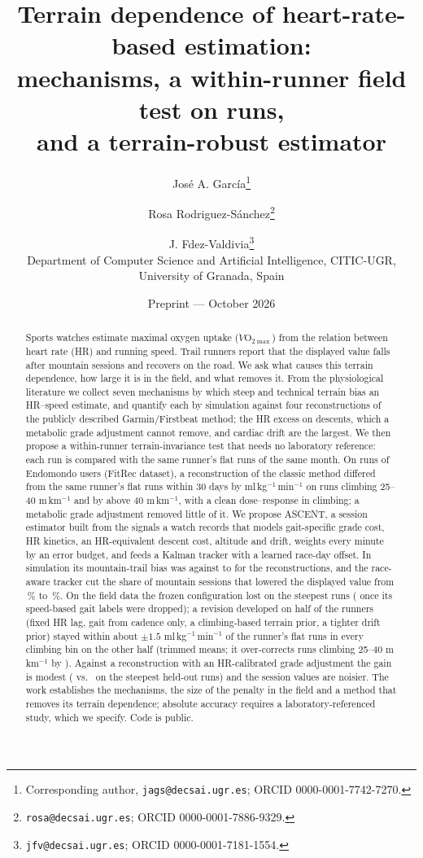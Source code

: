 \documentclass[11pt,a4paper]{article}
\title{\vspace{-1.2cm}\textbf{Terrain dependence of heart-rate-based \VOmax{} estimation:\\ mechanisms, a within-runner field test on \nnFitrecRuns{} runs,\\ and a terrain-robust estimator}}
\author{Jos\'e A. Garc\'ia\thanks{Corresponding author, \texttt{jags@decsai.ugr.es}; ORCID 0000-0001-7742-7270.} \and Rosa Rodriguez-S\'anchez\thanks{\texttt{rosa@decsai.ugr.es}; ORCID 0000-0001-7886-9329.} \and J. Fdez-Valdivia\thanks{\texttt{jfv@decsai.ugr.es}; ORCID 0000-0001-7181-1554.}\\[2pt]
\small Department of Computer Science and Artificial Intelligence, CITIC-UGR, University of Granada, Spain}
\date{\small Preprint --- October 2026}
\newcommand{\VOmax}{\ensuremath{\dot V\mathrm{O}_{2\max}}}
\newcommand{\unit}{ml\,kg$^{-1}$\,min$^{-1}$}
\newcommand{\ascent}{ASCENT}
\begin{document}
\maketitle

\begin{abstract}
\noindent
Sports watches estimate maximal oxygen uptake (\VOmax) from the relation between heart rate (HR) and running speed. Trail runners report that the displayed value falls after mountain sessions and recovers on the road. We ask what causes this terrain dependence, how large it is in the field, and what removes it. From the physiological literature we collect seven mechanisms by which steep and technical terrain bias an HR--speed estimate, and quantify each by simulation against four reconstructions of the publicly described Garmin/Firstbeat method; the HR excess on descents, which a metabolic grade adjustment cannot remove, and cardiac drift are the largest. We then propose a within-runner terrain-invariance test that needs no laboratory reference: each run is compared with the same runner's flat runs of the same month. On \nnFitrecRuns{} runs of \nnFitrecRunners{} Endomondo users (FitRec dataset), a reconstruction of the classic method differed from the same runner's flat runs within 30 days by \nfrTrimCGflat{} \unit{} on runs climbing 25--40 m\,km$^{-1}$ and by \nfrTrimDGflat{} above 40 m\,km$^{-1}$, with a clean dose--response in climbing; a metabolic grade adjustment removed little of it. We propose \ascent, a session estimator built from the signals a watch records that models gait-specific grade cost, HR kinetics, an HR-equivalent descent cost, altitude and drift, weights every minute by an error budget, and feeds a Kalman tracker with a learned race-day offset. In simulation its mountain-trail bias was \nbiasASCENTmountain{} against \nbiasGflatmountain{} to \nbiasGtrailhrgapmountain{} for the reconstructions, and the race-aware tracker cut the share of mountain sessions that lowered the displayed value from \nlongDropMtnGarmin\,\% to \nlongDropMtnRace\,\%. On the field data the frozen configuration lost \nfrTrimDASCENTgh{} on the steepest runs (\nfrTrimDASCENT{} once its speed-based gait labels were dropped); a revision developed on half of the runners (fixed HR lag, gait from cadence only, a climbing-based terrain prior, a tighter drift prior) stayed within about $\pm1.5$ \unit{} of the runner's flat runs in every climbing bin on the other half (trimmed means; it over-corrects runs climbing 25--40 m\,km$^{-1}$ by \nvtestCTwo). Against a reconstruction with an HR-calibrated grade adjustment the gain is modest (\nvtestDTwo{} vs.\ \nvtestDGhrgap{} on the steepest held-out runs) and the session values are noisier. The work establishes the mechanisms, the size of the penalty in the field and a method that removes its terrain dependence; absolute accuracy requires a laboratory-referenced study, which we specify. Code is public.
\end{abstract}
\end{document}
